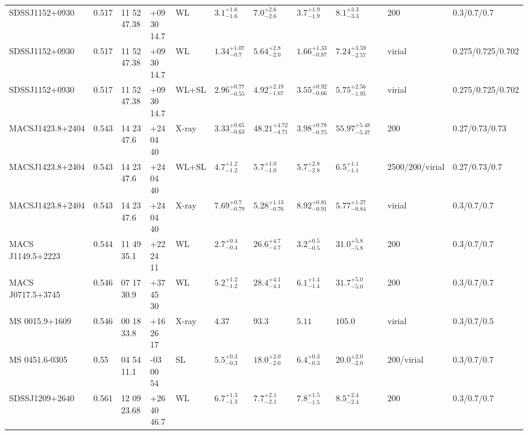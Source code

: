 \begin{landscape}
\begin{center}
{\begin{longtable}{llllllllllll}
SDSSJ1152+0930 & 0.517 & 11 52 47.38 & +09 30 14.7 & WL & ${3.1}^{+1.6}_{-1.6}$ & ${7.0}^{+2.6}_{-2.6}$ & ${3.7}^{+1.9}_{-1.9}$ & ${8.1}^{+3.3}_{-3.3}$ & \citet{SE14.1} & 200 & 0.3/0.7/0.7 \\
SDSSJ1152+0930 & 0.517 & 11 52 47.38 & +09 30 14.7 & WL & ${1.34}^{+1.07}_{-0.7}$ & ${5.64}^{+2.8}_{-2.0}$ & ${1.66}^{+1.33}_{-0.87}$ & ${7.24}^{+3.59}_{-2.57}$ & \citet{OG12.1} & virial & 0.275/0.725/0.702 \\
SDSSJ1152+0930 & 0.517 & 11 52 47.38 & +09 30 14.7 & WL+SL & ${2.96}^{+0.77}_{-0.55}$ & ${4.92}^{+2.19}_{-1.67}$ & ${3.55}^{+0.92}_{-0.66}$ & ${5.75}^{+2.56}_{-1.95}$ & \citet{OG12.1} & virial & 0.275/0.725/0.702 \\
MACSJ1423.8+2404 & 0.543 & 14 23 47.6 & +24 04 40 & X-ray & ${3.33}^{+0.65}_{-0.63}$ & ${48.21}^{+4.72}_{-4.71}$ & ${3.98}^{+0.78}_{-0.75}$ & ${55.97}^{+5.48}_{-5.47}$ & \citet{BA14.1} & 200 & 0.27/0.73/0.73 \\
MACSJ1423.8+2404 & 0.543 & 14 23 47.6 & +24 04 40 & WL+SL & ${4.7}^{+1.2}_{-1.2}$ & ${5.7}^{+1.0}_{-1.0}$ & ${5.7}^{+2.8}_{-2.8}$ & ${6.5}^{+1.1}_{-1.1}$ & \citet{ME14.1} & 2500/200/virial & 0.27/0.73/0.7 \\
MACSJ1423.8+2404 & 0.543 & 14 23 47.6 & +24 04 40 & X-ray & ${7.69}^{+0.7}_{-0.79}$ & ${5.28}^{+1.13}_{-0.76}$ & ${8.92}^{+0.81}_{-0.91}$ & ${5.77}^{+1.27}_{-0.84}$ & \citet{SC07.1} & virial & 0.3/0.7/0.7 \\
MACS J1149.5+2223 & 0.544 & 11 49 35.1 & +22 24 11 & WL & ${2.7}^{+0.4}_{-0.4}$ & ${26.6}^{+4.7}_{-4.7}$ & ${3.2}^{+0.5}_{-0.5}$ & ${31.0}^{+5.8}_{-5.8}$ & \citet{SE14.1} & 200 & 0.3/0.7/0.7 \\
MACS J0717.5+3745 & 0.546 & 07 17 30.9 & +37 45 30 & WL & ${5.2}^{+1.2}_{-1.2}$ & ${28.4}^{+4.1}_{-4.1}$ & ${6.1}^{+1.4}_{-1.4}$ & ${31.7}^{+5.0}_{-5.0}$ & \citet{SE14.1} & 200 & 0.3/0.7/0.7 \\
MS 0015.9+1609 & 0.546 & 00 18 33.8 & +16 26 17 & X-ray & ${4.37}^{}_{}$ & ${93.3}^{}_{}$ & ${5.11}^{}_{}$ & ${105.0}^{}_{}$ & \citet{MO99.1} & virial & 0.3/0.7/0.5 \\
MS 0451.6-0305 & 0.55 & 04 54 11.1 & -03 00 54 & SL & ${5.5}^{+0.3}_{-0.3}$ & ${18.0}^{+2.0}_{-2.0}$ & ${6.4}^{+0.3}_{-0.3}$ & ${20.0}^{+2.0}_{-2.0}$ & \citet{CO07.1} & 200/virial & 0.3/0.7/0.7 \\
SDSSJ1209+2640 & 0.561 & 12 09 23.68 & +26 40 46.7 & WL & ${6.7}^{+1.3}_{-1.3}$ & ${7.7}^{+2.1}_{-2.1}$ & ${7.8}^{+1.5}_{-1.5}$ & ${8.5}^{+2.4}_{-2.4}$ & \citet{SE14.1} & 200 & 0.3/0.7/0.7 \\

\end{longtable}}
\end{center}
\end{landscape}
